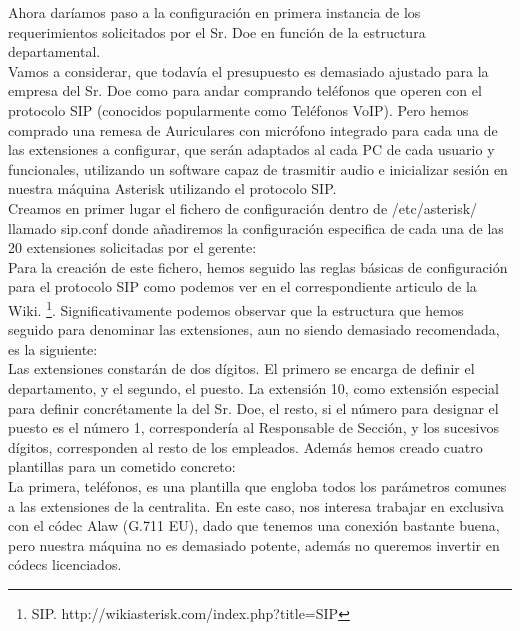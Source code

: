 Ahora daríamos paso a la configuración en primera instancia de los requerimientos solicitados por el Sr. Doe en función de la estructura departamental.\\

Vamos a considerar, que todavía el presupuesto es demasiado ajustado para la empresa del Sr. Doe como para andar comprando teléfonos que operen con el protocolo SIP (conocidos popularmente como Teléfonos VoIP). Pero hemos comprado una remesa de Auriculares con micrófono integrado para cada una de las extensiones a configurar, que serán adaptados al cada PC de cada usuario y funcionales, utilizando un software capaz de trasmitir audio e inicializar sesión en nuestra máquina Asterisk utilizando el protocolo SIP.\\

Creamos en primer lugar el fichero de configuración dentro de /etc/asterisk/ llamado sip.conf donde añadiremos la configuración especifica de cada una de las 20 extensiones solicitadas por el gerente:\\



Para la creación de este fichero, hemos seguido las reglas básicas de configuración para el protocolo SIP como podemos ver en el correspondiente articulo de la Wiki. \footnote{SIP. http://wikiasterisk.com/index.php?title=SIP}. Significativamente podemos observar que la estructura que hemos seguido para denominar las extensiones, aun no siendo demasiado recomendada, es la siguiente:\\

Las extensiones constarán de dos dígitos. El primero se encarga de definir el departamento, y el segundo, el puesto. La extensión 10, como extensión especial para definir concrétamente la del Sr. Doe, el resto, si el número para designar el puesto es el número 1, correspondería al Responsable de Sección, y los sucesivos dígitos, corresponden al resto de los empleados. Además hemos creado cuatro plantillas para un cometido concreto: \\

La primera, teléfonos, es una plantilla que engloba todos los parámetros comunes a las extensiones de la centralita. En este caso, nos interesa trabajar en exclusiva con el códec Alaw (G.711 EU), dado que tenemos una conexión bastante buena, pero nuestra máquina no es demasiado potente, además no queremos invertir en códecs licenciados.\\

